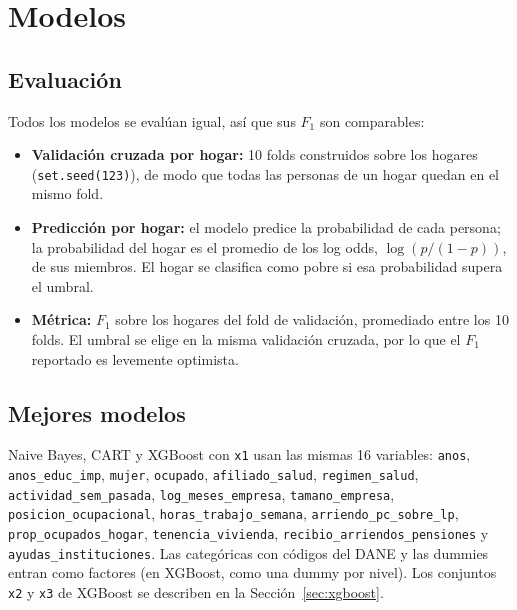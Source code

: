 \documentclass[12pt]{article}
\begin{document}
\section{Modelos}
\sloppy

\subsection{Evaluación}

Todos los modelos se evalúan igual, así que sus $F_1$ son comparables:

\begin{itemize}
  \item \textbf{Validación cruzada por hogar:} 10 folds construidos sobre los
    hogares (\texttt{set.seed(123)}), de modo que todas las personas de un
    hogar quedan en el mismo fold.
  \item \textbf{Predicción por hogar:} el modelo predice la probabilidad de
    cada persona; la probabilidad del hogar es el promedio de los log odds,
    $\log(p/(1-p))$, de sus miembros. El hogar se clasifica como pobre si esa
    probabilidad supera el umbral.
  \item \textbf{Métrica:} $F_1$ sobre los hogares del fold de validación,
    promediado entre los 10 folds. El umbral se elige en la misma validación
    cruzada, por lo que el $F_1$ reportado es levemente optimista.
\end{itemize}

\subsection{Mejores modelos}

Naive Bayes, CART y XGBoost con \texttt{x1} usan las mismas 16 variables:
\texttt{anos}, \texttt{anos\_educ\_imp}, \texttt{mujer}, \texttt{ocupado},
\texttt{afiliado\_salud}, \texttt{regimen\_salud},
\texttt{actividad\_sem\_pasada}, \texttt{log\_meses\_empresa},
\texttt{tamano\_empresa}, \texttt{posicion\_ocupacional},
\texttt{horas\_trabajo\_semana}, \texttt{arriendo\_pc\_sobre\_lp},
\texttt{prop\_ocupados\_hogar}, \texttt{tenencia\_vivienda},
\texttt{recibio\_arriendos\_pensiones} y \texttt{ayudas\_instituciones}.
Las categóricas con códigos del DANE y las dummies entran como factores (en
XGBoost, como una dummy por nivel). Los conjuntos \texttt{x2} y \texttt{x3}
de XGBoost se describen en la Sección~\ref{sec:xgboost}.
\end{document}
